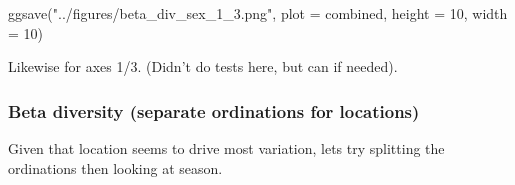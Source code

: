 \documentclass[
  letterpaper,
  DIV=11,
  numbers=noendperiod]{scrartcl}
\newenvironment{Shaded}{\begin{snugshade}}{\end{snugshade}}
\newcommand{\AttributeTok}[1]{\textcolor[rgb]{0.40,0.45,0.13}{#1}}
\newcommand{\DecValTok}[1]{\textcolor[rgb]{0.68,0.00,0.00}{#1}}
\newcommand{\FunctionTok}[1]{\textcolor[rgb]{0.28,0.35,0.67}{#1}}
\newcommand{\NormalTok}[1]{\textcolor[rgb]{0.00,0.23,0.31}{#1}}
\newcommand{\StringTok}[1]{\textcolor[rgb]{0.13,0.47,0.30}{#1}}
\begin{document}
\begin{Shaded}
\begin{Highlighting}[]
\FunctionTok{ggsave}\NormalTok{(}\StringTok{"../figures/beta\_div\_sex\_1\_3.png"}\NormalTok{, }\AttributeTok{plot =}\NormalTok{ combined, }\AttributeTok{height =} \DecValTok{10}\NormalTok{, }\AttributeTok{width =} \DecValTok{10}\NormalTok{)}
\end{Highlighting}
\end{Shaded}

Likewise for axes 1/3. (Didn't do tests here, but can if needed).

\subsubsection{Beta diversity (separate ordinations for
locations)}\label{beta-diversity-separate-ordinations-for-locations}

Given that location seems to drive most variation, lets try splitting
the ordinations then looking at season.
\end{document}
